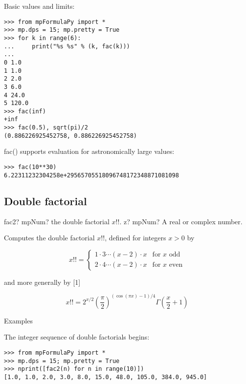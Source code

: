 Basic values and limits:

\begin{lstlisting}
>>> from mpFormulaPy import *
>>> mp.dps = 15; mp.pretty = True
>>> for k in range(6):
...     print("%s %s" % (k, fac(k)))
...
0 1.0
1 1.0
2 2.0
3 6.0
4 24.0
5 120.0
>>> fac(inf)
+inf
>>> fac(0.5), sqrt(pi)/2
(0.886226925452758, 0.886226925452758)
\end{lstlisting}

fac() supports evaluation for astronomically large values:
\begin{lstlisting}
>>> fac(10**30)
6.22311232304258e+29565705518096748172348871081098
\end{lstlisting}


\subsection{Double factorial}


\begin{mpFunctionsExtract}
	\mpFunctionOne
	{fac2? mpNum? the double factorial $x!!$.}
	{z? mpNum? A real or complex number.}
\end{mpFunctionsExtract}



Computes the double factorial $x!!$, defined for integers $x>0$ by

\begin{equation}
  x!!=\begin{cases}
    1\cdot 3 \cdots (x-2) \cdot x & \text{for }x \text{ odd}\\
    2\cdot 4 \cdots (x-2) \cdot x & \text{for }x  \text{ even}
  \end{cases}
\end{equation}

and more generally by [1]

\begin{equation}
x!! = 2^{x/2}\left(\frac{\pi}{2}\right)^{(\cos(\pi x)-1)/4} \Gamma \left(\frac{x}{2}+1 \right)
\end{equation}


Examples

The integer sequence of double factorials begins:

\begin{lstlisting}
>>> from mpFormulaPy import *
>>> mp.dps = 15; mp.pretty = True
>>> nprint([fac2(n) for n in range(10)])
[1.0, 1.0, 2.0, 3.0, 8.0, 15.0, 48.0, 105.0, 384.0, 945.0]
\end{lstlisting}

